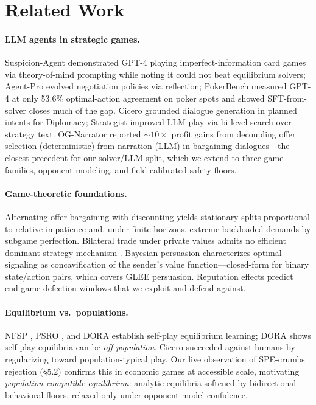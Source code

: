 \documentclass[11pt]{article}
\begin{document}
\section{Related Work}
\paragraph{LLM agents in strategic games.} Suspicion-Agent \citep{guo2024suspicion} demonstrated GPT-4 playing imperfect-information card games via theory-of-mind prompting while noting it could not beat equilibrium solvers; Agent-Pro \citep{zhang2024agentpro} evolved negotiation policies via reflection; PokerBench \citep{zhuang2025pokerbench} measured GPT-4 at only 53.6\% optimal-action agreement on poker spots and showed SFT-from-solver closes much of the gap. Cicero \citep{fa2022cicero} grounded dialogue generation in planned intents for Diplomacy; Strategist \citep{light2025strategist} improved LLM play via bi-level search over strategy text. OG-Narrator \citep{narrator2024} reported ${\sim}10\times$ profit gains from decoupling offer selection (deterministic) from narration (LLM) in bargaining dialogues---the closest precedent for our solver/LLM split, which we extend to three game families, opponent modeling, and field-calibrated safety floors.

\paragraph{Game-theoretic foundations.} Alternating-offer bargaining with discounting \citep{stahl1972bargaining,rubinstein1982perfect} yields stationary splits proportional to relative impatience and, under finite horizons, extreme backloaded demands by subgame perfection. Bilateral trade under private values admits no efficient dominant-strategy mechanism \citep{myerson1983efficient}. Bayesian persuasion \citep{kamenica2011bayesian} characterizes optimal signaling as concavification of the sender's value function---closed-form for binary state/action pairs, which covers GLEE persuasion. Reputation effects predict end-game defection windows \citep{kreps1982reputation} that we exploit and defend against.

\paragraph{Equilibrium vs.\ populations.} NFSP \citep{heinrich2016nfsp}, PSRO \citep{lanctot2017psro}, and DORA \citep{bakhtin2021dora} establish self-play equilibrium learning; DORA shows self-play equilibria can be \emph{off-population}. Cicero succeeded against humans by regularizing toward population-typical play. Our live observation of SPE-crumbs rejection (\S5.2) confirms this in economic games at accessible scale, motivating \emph{population-compatible equilibrium}: analytic equilibria softened by bidirectional behavioral floors, relaxed only under opponent-model confidence.
\end{document}
